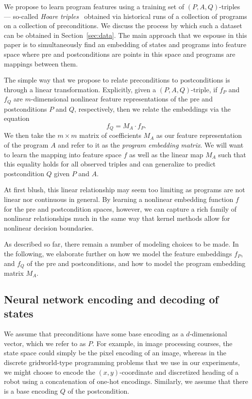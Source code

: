 We propose to learn program features using a training set of $(P, A, Q)$-triples --- so-called \emph{Hoare triples}~\cite{hoare1969axiomatic}
obtained via historical runs of a collection of programs on a collection of preconditions.
We discuss the process by which such a dataset can be obtained  in Section~\ref{sec:data}. 
The main approach that we espouse in this paper is to simultaneously find an embedding of states and programs into feature space where pre and postconditions are points in this space and programs are mappings between them.

The simple way that we propose to relate preconditions to postconditions
is through a linear transformation.  Explicitly, given a
$(P, A, Q)$-triple, if $f_P$ and $f_Q$ are $m$-dimensional nonlinear feature
representations of the pre and postconditions $P$ and $Q$, respectively,
then we relate the embeddings via the equation
\begin{equation}\label{eqn:linearmap}
f_Q = M_A \cdot f_P.   
\end{equation}
We then take the $m\times m$ matrix of coefficients $M_A$
as our feature representation of the program $A$ and refer to it as
the \emph{program embedding matrix}. 
We will want to learn the mapping into feature space $f$ 
as well as the linear map $M_A$ such that 
this equality holds for all observed triples and can
generalize to predict postcondition $Q$ given $P$ and $A$.


At first blush, this linear relationship may seem too limiting
as programs are not linear nor continuous in general.  By learning a nonlinear embedding function $f$ for the pre and postcondition spaces,
however, we can capture a rich family of nonlinear relationships
much in the same way that kernel methods allow for nonlinear decision boundaries.

As described so far, there remain a number of modeling choices to be made. In the following, we elaborate further on how we model the
feature embeddings $f_P$, and $f_Q$ of the pre and postconditions, and how to model the program embedding matrix $M_A$.


\subsection{Neural network encoding and decoding of states}
We assume that preconditions have some base encoding as a $d$-dimensional vector, which we refer to as $P$.
For example, in image processing courses, the state space could simply be
the pixel encoding of an image, whereas
in the discrete gridworld-type programming problems that we use in our experiments, we might choose to encode the $(x,y)$-coordinate
and discretized heading of a robot using a concatenation of 
one-hot encodings. 
Similarly, we assume that there is a base encoding $Q$ of the postcondition.

